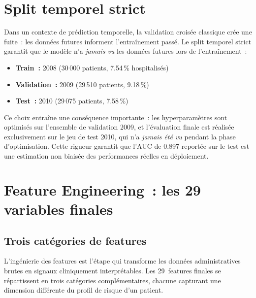 \section{Split temporel strict}

\begin{alertbox}
Dans un contexte de prédiction temporelle, la validation croisée classique
crée une fuite~: les données futures informent l'entraînement passé. Le split
temporel strict garantit que le modèle n'a \textit{jamais vu} les données
futures lors de l'entraînement~:
\begin{itemize}
  \item \textbf{Train~:} 2008 (30\,000 patients, 7.54\,\% hospitalisés)
  \item \textbf{Validation~:} 2009 (29\,510 patients, 9.18\,\%)
  \item \textbf{Test~:} 2010 (29\,075 patients, 7.58\,\%)
\end{itemize}
\end{alertbox}

Ce choix entraîne une conséquence importante~: les hyperparamètres sont optimisés
sur l'ensemble de validation 2009, et l'évaluation finale est réalisée exclusivement
sur le jeu de test 2010, qui n'a \textit{jamais été vu} pendant la phase d'optimisation.
Cette rigueur garantit que l'AUC de 0.897 reportée sur le test est une estimation
non biaisée des performances réelles en déploiement.


\section{Feature Engineering~: les 29 variables finales}

\subsection{Trois catégories de features}

L'ingénierie des features est l'étape qui transforme les données administratives
brutes en signaux cliniquement interprétables. Les 29~features finales se répartissent
en trois catégories complémentaires, chacune capturant une dimension différente du
profil de risque d'un patient.

